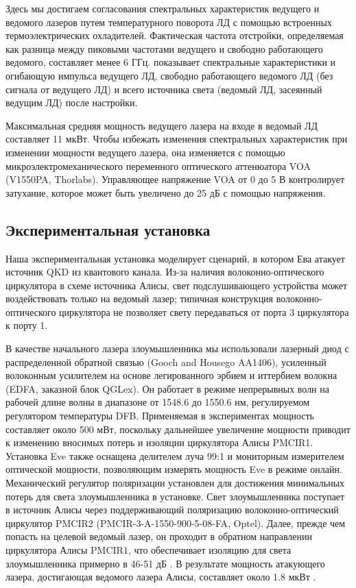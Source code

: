 Здесь мы достигаем согласования спектральных характеристик ведущего и ведомого лазеров путем температурного поворота ЛД с помощью встроенных термоэлектрических охладителей. Фактическая частота отстройки, определяемая как разница между пиковыми частотами ведущего и свободно работающего ведомого, составляет менее 6 ГГц.  показывает спектральные характеристики и огибающую импульса ведущего ЛД, свободно работающего ведомого ЛД (без сигнала от ведущего ЛД) и всего источника света (ведомый ЛД, засеянный ведущим ЛД) после настройки. 

Максимальная средняя мощность ведущего лазера на входе в ведомый ЛД составляет 11 мкВт. Чтобы избежать изменения спектральных характеристик при изменении мощности ведущего лазера, она изменяется с помощью микроэлектромеханического переменного оптического аттенюатора VOA (V1550PA, Thorlabs). Управляющее напряжение VOA от 0 до 5 В контролирует затухание, которое может быть увеличено до 25 дБ с помощью напряжения. 

\subsection{Экспериментальная установка}

Наша экспериментальная установка моделирует сценарий, в котором Ева атакует источник QKD из квантового канала. Из-за наличия волоконно-оптического циркулятора в схеме источника Алисы, свет подслушивающего устройства может воздействовать только на ведомый лазер; типичная конструкция волоконно-оптического циркулятора не позволяет свету передаваться от порта 3 циркулятора к порту 1.

В качестве начального лазера злоумышленника мы использовали лазерный диод с распределенной обратной связью (Gooch and Housego AA1406), усиленный волоконным усилителем на основе легированного эрбием и иттербием волокна (EDFA, заказной блок QGLex)\cite{huang2020}. Он работает в режиме непрерывных волн на рабочей длине волны в диапазоне от 1548.6  до 1550.6 нм, регулируемом регулятором температуры DFB. Применяемая в экспериментах мощность составляет около 500 мВт, поскольку дальнейшее увеличение мощности приводит к изменению вносимых потерь и изоляции циркулятора Алисы PMCIR1. Установка Eve также оснащена делителем луча 99:1 и мониторным измерителем оптической мощности, позволяющим измерять мощность Eve в режиме онлайн. Механический регулятор поляризации установлен для достижения минимальных потерь для света злоумышленника в установке. Свет злоумышленника поступает в источник Алисы через поддерживающий поляризацию волоконно-оптический циркулятор PMCIR2 (PMCIR-3-A-1550-900-5-08-FA, Optel). Далее, прежде чем попасть на целевой ведомый лазер, он проходит в обратном направлении циркулятора Алисы PMCIR1, что обеспечивает изоляцию для света злоумышленника примерно в 46-51 дБ . В результате мощность атакующего лазера, достигающая ведомого лазера Алисы, составляет около 1.8 мкВт .

